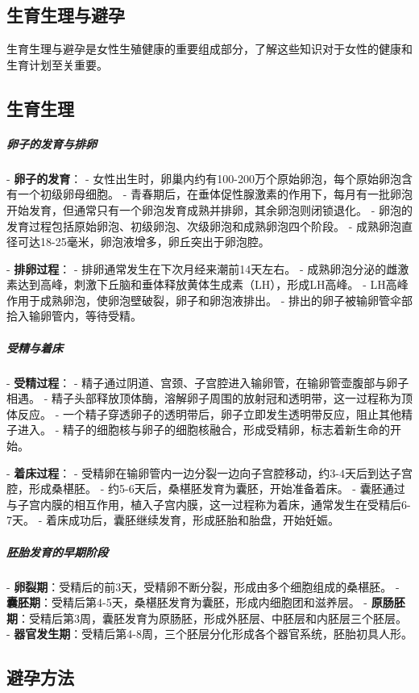 \begin{enumerate}
\section{生育生理与避孕}

生育生理与避孕是女性生殖健康的重要组成部分，了解这些知识对于女性的健康和生育计划至关重要。

\subsection{生育生理}

\subparagraph{卵子的发育与排卵}

- \textbf{卵子的发育}：
  - 女性出生时，卵巢内约有100-200万个原始卵泡，每个原始卵泡含有一个初级卵母细胞。
  - 青春期后，在垂体促性腺激素的作用下，每月有一批卵泡开始发育，但通常只有一个卵泡发育成熟并排卵，其余卵泡则闭锁退化。
  - 卵泡的发育过程包括原始卵泡、初级卵泡、次级卵泡和成熟卵泡四个阶段。
  - 成熟卵泡直径可达18-25毫米，卵泡液增多，卵丘突出于卵泡腔。

- \textbf{排卵过程}：
  - 排卵通常发生在下次月经来潮前14天左右。
  - 成熟卵泡分泌的雌激素达到高峰，刺激下丘脑和垂体释放黄体生成素（LH），形成LH高峰。
  - LH高峰作用于成熟卵泡，使卵泡壁破裂，卵子和卵泡液排出。
  - 排出的卵子被输卵管伞部拾入输卵管内，等待受精。

\subparagraph{受精与着床}

- \textbf{受精过程}：
  - 精子通过阴道、宫颈、子宫腔进入输卵管，在输卵管壶腹部与卵子相遇。
  - 精子头部释放顶体酶，溶解卵子周围的放射冠和透明带，这一过程称为顶体反应。
  - 一个精子穿透卵子的透明带后，卵子立即发生透明带反应，阻止其他精子进入。
  - 精子的细胞核与卵子的细胞核融合，形成受精卵，标志着新生命的开始。

- \textbf{着床过程}：
  - 受精卵在输卵管内一边分裂一边向子宫腔移动，约3-4天后到达子宫腔，形成桑椹胚。
  - 约5-6天后，桑椹胚发育为囊胚，开始准备着床。
  - 囊胚通过与子宫内膜的相互作用，植入子宫内膜，这一过程称为着床，通常发生在受精后6-7天。
  - 着床成功后，囊胚继续发育，形成胚胎和胎盘，开始妊娠。

\subparagraph{胚胎发育的早期阶段}

- \textbf{卵裂期}：受精后的前3天，受精卵不断分裂，形成由多个细胞组成的桑椹胚。
- \textbf{囊胚期}：受精后第4-5天，桑椹胚发育为囊胚，形成内细胞团和滋养层。
- \textbf{原肠胚期}：受精后第3周，囊胚发育为原肠胚，形成外胚层、中胚层和内胚层三个胚层。
- \textbf{器官发生期}：受精后第4-8周，三个胚层分化形成各个器官系统，胚胎初具人形。

\subsection{避孕方法}


\end{enumerate}
